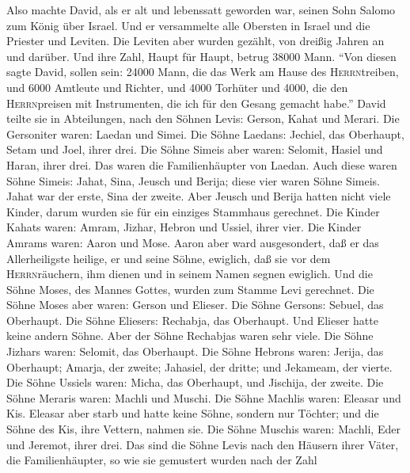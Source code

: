  Also machte David, als er alt und lebenssatt geworden
war, seinen Sohn Salomo zum König über Israel.  Und er
versammelte alle Obersten in Israel und die Priester und Leviten.
 Die Leviten aber wurden gezählt, von dreißig Jahren an
und darüber. Und ihre Zahl, Haupt für Haupt, betrug 38000 Mann.
 ``Von diesen sagte David, sollen sein: 24000 Mann, die
das Werk am Hause des \textsc{Herrn}treiben, und 6000 Amtleute und
Richter,  und 4000 Torhüter und 4000, die den
\textsc{Herrn}preisen mit Instrumenten, die ich für den Gesang gemacht
habe.''  David teilte sie in Abteilungen, nach den Söhnen
Levis: Gerson, Kahat und Merari.  Die Gersoniter waren:
Laedan und Simei.  Die Söhne Laedans: Jechiel, das
Oberhaupt, Setam und Joel, ihrer drei.  Die Söhne Simeis
aber waren: Selomit, Hasiel und Haran, ihrer drei. Das waren die
Familienhäupter von Laedan.  Auch diese waren Söhne
Simeis: Jahat, Sina, Jeusch und Berija; diese vier waren Söhne Simeis.
 Jahat war der erste, Sina der zweite. Aber Jeusch und
Berija hatten nicht viele Kinder, darum wurden sie für ein einziges
Stammhaus gerechnet.  Die Kinder Kahats waren: Amram,
Jizhar, Hebron und Ussiel, ihrer vier.  Die Kinder Amrams
waren: Aaron und Mose. Aaron aber ward ausgesondert, daß er das
Allerheiligste heilige, er und seine Söhne, ewiglich, daß sie vor dem
\textsc{Herrn}räuchern, ihm dienen und in seinem Namen segnen ewiglich.
 Und die Söhne Moses, des Mannes Gottes, wurden zum
Stamme Levi gerechnet.  Die Söhne Moses aber waren:
Gerson und Elieser.  Die Söhne Gersons: Sebuel, das
Oberhaupt.  Die Söhne Eliesers: Rechabja, das Oberhaupt.
Und Elieser hatte keine andern Söhne. Aber der Söhne Rechabjas waren
sehr viele.  Die Söhne Jizhars waren: Selomit, das
Oberhaupt.  Die Söhne Hebrons waren: Jerija, das
Oberhaupt; Amarja, der zweite; Jahasiel, der dritte; und Jekameam, der
vierte.  Die Söhne Ussiels waren: Micha, das Oberhaupt,
und Jischija, der zweite.  Die Söhne Meraris waren:
Machli und Muschi. Die Söhne Machlis waren: Eleasar und Kis.
 Eleasar aber starb und hatte keine Söhne, sondern nur
Töchter; und die Söhne des Kis, ihre Vettern, nahmen sie.
 Die Söhne Muschis waren: Machli, Eder und Jeremot, ihrer
drei.  Das sind die Söhne Levis nach den Häusern ihrer
Väter, die Familienhäupter, so wie sie gemustert wurden nach der Zahl
